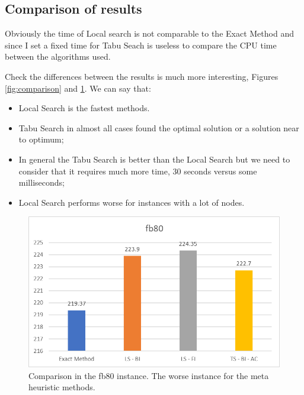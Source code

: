 
\subsection{Comparison of results}

	Obviously the time of Local search is not comparable to the Exact Method and since I set a fixed time for Tabu Seach is useless to compare the CPU time between the algorithms used.
	
	Check the differences between the results is much more interesting, Figures \ref{fig:comparison} and \ref{fig:fb80-comparison}. We can say that:
	\begin{itemize}
		\item Local Search is the fastest methods.
		\item Tabu Search in almost all cases found the optimal solution or a solution near to optimum;
		\item In general the Tabu Search is better than the Local Search but we need to consider that it requires much more time, 30 seconds versus some milliseconds;
		\item Local Search performs worse for instances with a lot of nodes.
	\end{itemize}

	\vspace{2cm}
	
	\begin{figure}[bh]
		\centering
		\includegraphics[width=\linewidth]{img/fb80-comparison}
		\caption{Comparison in the fb80 instance. The worse instance for the meta heuristic methods.}
		\label{fig:fb80-comparison}
	\end{figure}
	
